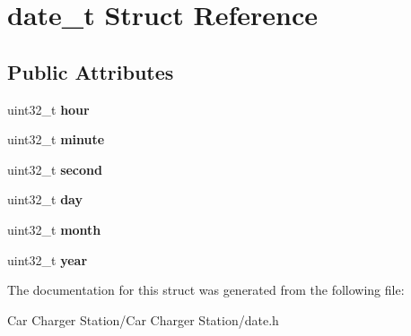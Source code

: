 \hypertarget{structdate__t}{\section{date\+\_\+t Struct Reference}
\label{structdate__t}
}
\subsection*{Public Attributes}
\begin{DoxyCompactItemize}
\item 
\hypertarget{structdate__t_a3a66225334dfad126d73058a865e4512}{uint32\+\_\+t {\bfseries hour}}\label{structdate__t_a3a66225334dfad126d73058a865e4512}

\item 
\hypertarget{structdate__t_a06d145374d05314af51daa8e199539dc}{uint32\+\_\+t {\bfseries minute}}\label{structdate__t_a06d145374d05314af51daa8e199539dc}

\item 
\hypertarget{structdate__t_ac09085f1f19477ce3c7dc30736ceef76}{uint32\+\_\+t {\bfseries second}}\label{structdate__t_ac09085f1f19477ce3c7dc30736ceef76}

\item 
\hypertarget{structdate__t_ac6b955b224f6a1416b8f534c01e01ca8}{uint32\+\_\+t {\bfseries day}}\label{structdate__t_ac6b955b224f6a1416b8f534c01e01ca8}

\item 
\hypertarget{structdate__t_af72a990e1d97b458a209c80782ac1b17}{uint32\+\_\+t {\bfseries month}}\label{structdate__t_af72a990e1d97b458a209c80782ac1b17}

\item 
\hypertarget{structdate__t_a115a68df5813183ea8bc38bf591f8c9f}{uint32\+\_\+t {\bfseries year}}\label{structdate__t_a115a68df5813183ea8bc38bf591f8c9f}

\end{DoxyCompactItemize}


The documentation for this struct was generated from the following file\+:\begin{DoxyCompactItemize}
\item 
Car Charger Station/\+Car Charger Station/date.\+h\end{DoxyCompactItemize}
